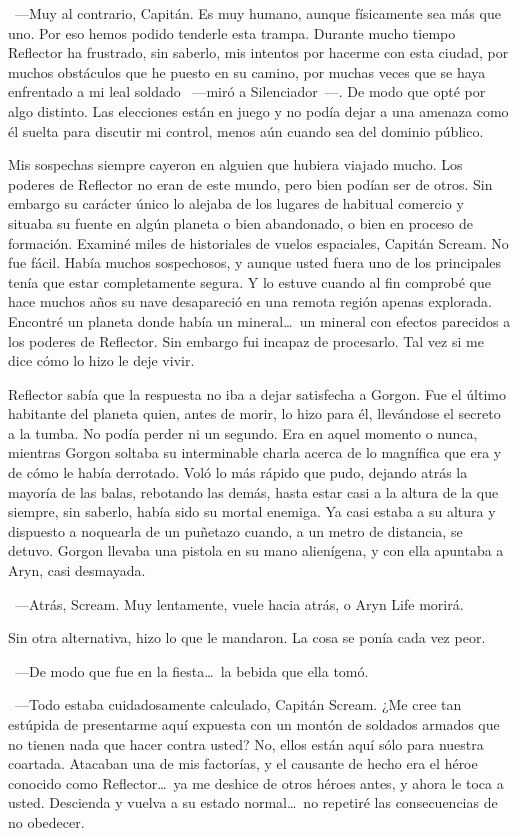 ~---Muy al contrario, Capitán. Es muy humano, aunque físicamente sea más que uno. Por eso hemos podido tenderle esta trampa. Durante mucho tiempo Reflector ha frustrado, sin saberlo, mis intentos por hacerme con esta ciudad, por muchos obstáculos que he puesto en su camino, por muchas veces que se haya enfrentado a mi leal soldado ~---miró a Silenciador~---. De modo que opté por algo distinto. Las elecciones están en juego y no podía dejar a una amenaza como él suelta para discutir mi control, menos aún cuando sea del dominio público.

\rquoti Mis sospechas siempre cayeron en alguien que hubiera viajado mucho. Los poderes de Reflector no eran de este mundo, pero bien podían ser de otros. Sin embargo su carácter único lo alejaba de los lugares de habitual comercio y situaba su fuente en algún planeta o bien abandonado, o bien en proceso de formación. Examiné miles de historiales de vuelos espaciales, Capitán Scream. No fue fácil. Había muchos sospechosos, y aunque usted fuera uno de los principales tenía que estar completamente segura. Y lo estuve cuando al fin comprobé que hace muchos años su nave desapareció en una remota región apenas explorada. Encontré un planeta donde había un mineral\dots\ un mineral con efectos parecidos a los poderes de Reflector. Sin embargo fui incapaz de procesarlo. Tal vez si me dice cómo lo hizo le deje vivir.

Reflector sabía que la respuesta no iba a dejar satisfecha a Gorgon. Fue el último habitante del planeta quien, antes de morir, lo hizo para él, llevándose el secreto a la tumba. No podía perder ni un segundo. Era en aquel momento o nunca, mientras Gorgon soltaba su interminable charla acerca de lo magnífica que era y de cómo le había derrotado. Voló lo más rápido que pudo, dejando atrás la mayoría de las balas, rebotando las demás, hasta estar casi a la altura de la que siempre, sin saberlo, había sido su mortal enemiga. Ya casi estaba a su altura y dispuesto a noquearla de un puñetazo cuando, a un metro de distancia, se detuvo. Gorgon llevaba una pistola en su mano alienígena, y con ella apuntaba a Aryn, casi desmayada.

~---Atrás, Scream. Muy lentamente, vuele hacia atrás, o Aryn Life morirá.

Sin otra alternativa, hizo lo que le mandaron. La cosa se ponía cada vez peor.

~---De modo que fue en la fiesta\dots\ la bebida que ella tomó.

~---Todo estaba cuidadosamente calculado, Capitán Scream. ¿Me cree tan estúpida de presentarme aquí expuesta con un montón de soldados armados que no tienen nada que hacer contra usted? No, ellos están aquí sólo para nuestra coartada. Atacaban una de mis factorías, y el causante de hecho era el héroe conocido como Reflector\dots\ ya me deshice de otros héroes antes, y ahora le toca a usted. Descienda y vuelva a su estado normal\dots\ no repetiré las consecuencias de no obedecer.

